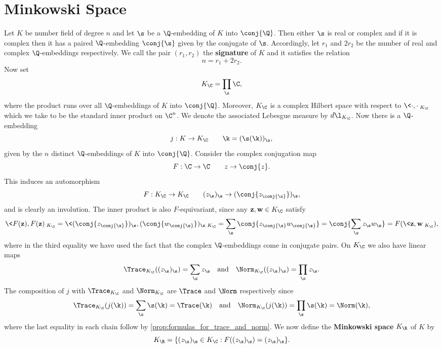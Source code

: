   \section{Minkowski Space}
    Let $K$ be number field of degree $n$ and let $\s$ be a $\Q$-embedding of $K$ into $\conj{\Q}$. Then either $\s$ is real or complex and if it is complex then it has a paired $\Q$-embedding $\conj{\s}$ given by the conjugate of $\s$. Accordingly, let $r_{1}$ and $2r_{2}$ be the number of real and complex $\Q$-embeddings respectively. We call the pair $(r_{1},r_{2})$ the \textbf{signature} of $K$ and it satisfies the relation
    \[
      n = r_{1}+2r_{2}.
    \]
    Now set
    \[
      K_{\C} = \prod_{\s}\C,
    \]
    where the product runs over all $\Q$-embeddings of $K$ into $\conj{\Q}$. Moreover, $K_{\C}$ is a complex Hilbert space with respect to $\<\cdot,\cdot\>_{K_{\C}}$ which we take to be the standard inner product on $\C^{n}$. We denote the associated Lebesgue measure by $d\l_{K_{\C}}$. Now there is a $\Q$-embedding
    \[
      j:K \to K_{\C} \qquad \k = (\s(\k))_{\s},
    \]
    given by the $n$ distinct $\Q$-embeddings of $K$ into $\conj{\Q}$. Consider the complex conjugation map
    \[
      F:\C \to \C \qquad z \to \conj{z}.
    \]
    This induces an automorphism
    \[
      F:K_{\C} \to K_{\C} \qquad (z_{\s})_{\s} \to (\conj{z_{\conj{\s}}})_{\s},
    \]
    and is clearly an involution. The inner product is also $F$-equivariant, since any $\mathbf{z},\mathbf{w} \in K_{\C}$ satisfy
    \[
      \<F(\mathbf{z}),F(\mathbf{z})\>_{K_{\C}} = \<(\conj{z_{\conj{\s}}})_{\s},(\conj{w_{\conj{\s}}})_{\s}\>_{K_{\C}} = \sum_{\s}\conj{z_{\conj{\s}}w_{\conj{\s}}} = \conj{\sum_{\s}z_{\s}w_{\s}} = F(\<\mathbf{z},\mathbf{w}\>_{K_{\C}}),
    \]
    where in the third equality we have used the fact that the complex $\Q$-embeddings come in conjugate pairs. On $K_{\C}$ we also have linear maps
    \[
      \Trace_{K_{\C}}((z_{\s})_{\s}) = \sum_{\s}z_{\s} \quad \text{and} \quad \Norm_{K_{\C}}((z_{\s})_{\s}) = \prod_{\s}z_{\s}.
    \]
    The composition of $j$ with $\Trace_{K_{\C}}$ and $\Norm_{K_{\C}}$ are $\Trace$ and $\Norm$ respectively since
    \[
      \Trace_{K_{\C}}(j(\k)) = \sum_{\s}\s(\k) = \Trace(\k) \quad \text{and} \quad \Norm_{K_{\C}}(j(\k)) = \prod_{\s}\s(\k) = \Norm(\k),
    \]
    where the last equality in each chain follow by \cref{prop:formulas_for_trace_and_norm}. We now define the \textbf{Minkowski space} $K_{\R}$ of $K$ by
    \[
      K_{\R} = \{(z_{\s})_{\s} \in K_{\C}:F((z_{\s})_{\s}) = (z_{\s})_{\s}\}.
    \]
